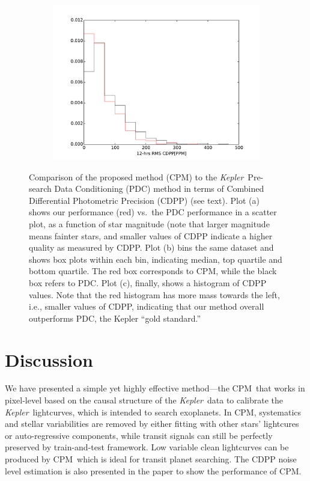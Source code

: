 \documentclass[12pt, preprint]{aastex}
\newcommand{\project}[1]{\textsl{#1}}
\newcommand{\Kepler}{\project{Kepler}}
\newcommand{\name}{CPM}
\begin{document}
\begin{figure}[htb]
\begin{subfigure}[htb]{0.33\columnwidth}
\includegraphics[width=\columnwidth]{pdc_cdpp12_hist_r100}
\caption{}
\end{subfigure}
\caption{
  \label{cdpp} 
  Comparison of the proposed method (\name) to the \Kepler\ Pre-search Data Conditioning (PDC) method 
    in terms of Combined Differential Photometric Precision (CDPP) (see text). 
  Plot (a) shows our performance (red) vs.\ the PDC performance in a scatter plot, as a function of star magnitude 
    (note that larger magnitude means fainter stars, 
    and smaller values of CDPP indicate a higher quality as measured by CDPP.  
  Plot (b) bins the same dataset and shows box plots within each bin, 
    indicating median, top quartile and bottom quartile. 
  The red box corresponds to \name, while the black box refers to PDC. 
  Plot (c), finally, shows a histogram of CDPP values. 
  Note that the red histogram has more mass towards the left, i.e., smaller values of CDPP, 
    indicating that our method overall outperforms PDC, the Kepler ``gold standard.'' 
}
\end{figure}

\clearpage

\section{Discussion}
We have presented a simple yet highly effective method---the \name\ that works in pixel-level 
  based on the causal structure of the \Kepler\ data to calibrate the \Kepler\ lightcurves, 
  which is intended to search exoplanets.
In \name, systematics and stellar variabilities are removed by
  either fitting with other stars' lightcures or auto-regressive components,
  while transit signals can still be perfectly preserved by train-and-test framework.
Low variable clean lightcurves can be produced by \name\,  which is ideal for transit planet searching. 
The CDPP noise level estimation is also presented in the paper to show the performance of \name. 
\end{document}
